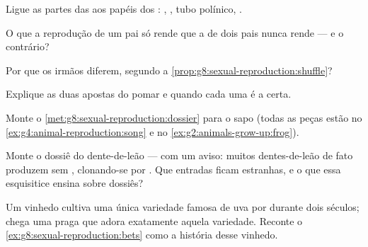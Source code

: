 \begin{exercise}[$\star$]\label{exo:g8:sexual-reproduction:4}
Ligue as partes das  aos papéis dos : , ,
tubo polínico, .
\end{exercise}

\begin{exercise}[$\star$]\label{exo:g8:sexual-reproduction:5}
O que a reprodução de um pai só rende que a de dois pais nunca rende
--- e o contrário?
\end{exercise}

\begin{exercise}[$\star$]\label{exo:g8:sexual-reproduction:6}
Por que os irmãos diferem, segundo a
\cref{prop:g8:sexual-reproduction:shuffle}?
\end{exercise}

\begin{exercise}[$\star\star$]\label{exo:g8:sexual-reproduction:7}
Explique as duas apostas do pomar e quando cada uma é a certa.
\end{exercise}

\begin{exercise}[$\star\star$]\label{exo:g8:sexual-reproduction:8}
Monte o \cref{met:g8:sexual-reproduction:dossier} para o sapo (todas
as peças estão no \cref{ex:g4:animal-reproduction:song} e no
\cref{ex:g2:animals-grow-up:frog}).
\end{exercise}

\begin{exercise}[$\star\star$]\label{exo:g8:sexual-reproduction:9}
Monte o dossiê do dente-de-leão --- com um aviso: muitos
dentes-de-leão de fato produzem  sem , clonando-se
por . Que entradas ficam estranhas, e o que essa esquisitice
ensina sobre dossiês?
\end{exercise}

\begin{exercise}[$\star\star$]\label{exo:g8:sexual-reproduction:10}
Um vinhedo cultiva uma única variedade famosa de uva por 
durante dois séculos; chega uma praga que adora exatamente aquela
variedade. Reconte o \cref{ex:g8:sexual-reproduction:bets} como a
história desse vinhedo.
\end{exercise}

